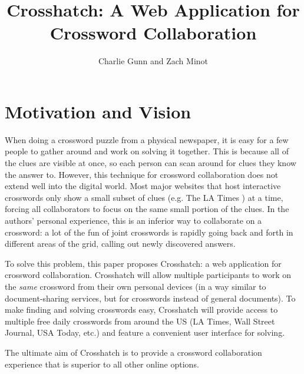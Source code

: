 \documentclass{article}
\author{Charlie Gunn and Zach Minot}
\title{Crosshatch: A Web Application for Crossword Collaboration}
\begin{document}
\maketitle

\section{Motivation and Vision}
\label{mot}
When doing a crossword puzzle from a physical newspaper, it is easy for a few people to gather around and work on solving it together.
This is because all of the clues are visible at once, so each person can scan around for clues they know the answer to. However, this technique
for crossword collaboration does not extend well into the digital world. Most major websites that host interactive crosswords only show a small subset of
clues (e.g. The LA Times \cite{latcrossword}) at a time, forcing all collaborators to focus on the same small portion of the clues. In the authors' personal experience,
this is an inferior way to collaborate on a crossword: a lot of the fun of joint crosswords is rapidly going back and forth in different areas
of the grid, calling out newly discovered answers.

To solve this problem, this paper proposes Crosshatch: a web application for crossword collaboration. Crosshatch will
allow multiple participants to work on the \textit{same} crossword from their own personal devices (in a way similar to document-sharing services,
but for crosswords instead of general documents). To make finding and solving crosswords easy, Crosshatch will provide access to multiple free daily crosswords
from around the US (LA Times, Wall Street Journal, USA Today, etc.) and feature a convenient user interface for solving.

The ultimate aim of Crosshatch is to provide a crossword collaboration experience that is superior to all other online options.
\end{document}
